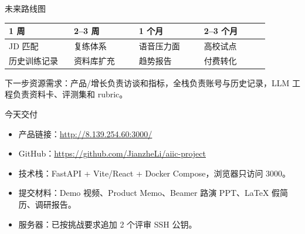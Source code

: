 \documentclass[aspectratio=169]{beamer}
\begin{document}
\begin{frame}{未来路线图}
  \begin{center}
    \begin{tabular}{p{0.22\linewidth}p{0.22\linewidth}p{0.22\linewidth}p{0.22\linewidth}}
      \toprule
      \textbf{1 周} & \textbf{2--3 周} & \textbf{1 个月} & \textbf{2--3 个月} \\
      \midrule
      JD 匹配 & 复练体系 & 语音压力面 & 高校试点 \\
      历史训练记录 & 资料库扩充 & 趋势报告 & 付费转化 \\
      \bottomrule
    \end{tabular}
  \end{center}
  \vspace{1em}
  \small 下一步资源需求：产品/增长负责访谈和指标，全栈负责账号与历史记录，LLM 工程负责资料卡、评测集和 rubric。
\end{frame}

\begin{frame}{今天交付}
  \begin{itemize}
    \item 产品链接：\href{http://8.139.254.60:3000/}{http://8.139.254.60:3000/}
    \item GitHub：\href{https://github.com/JianzheLi/aiic-project}{https://github.com/JianzheLi/aiic-project}
    \item 技术栈：FastAPI + Vite/React + Docker Compose，浏览器只访问 3000。
    \item 提交材料：Demo 视频、Product Memo、Beamer 路演 PPT、LaTeX 假简历、调研报告。
    \item 服务器：已按挑战要求追加 2 个评审 SSH 公钥。
  \end{itemize}
\end{frame}
\end{document}
